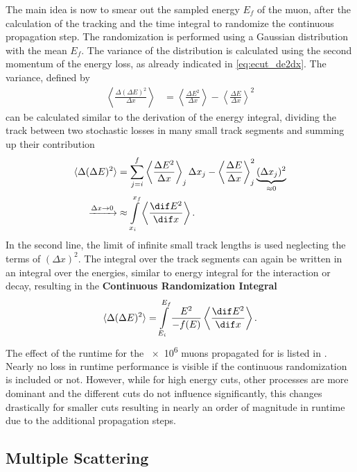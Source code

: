 The main idea is now to smear out the sampled energy $E_f$ of the muon, after the calculation of the tracking and the time integral to randomize the continuous propagation step.
The randomization is performed using a Gaussian distribution with the mean $E_f$.
The variance of the distribution is calculated using the second momentum of the energy loss, as already indicated in \eqref{eq:ecut_de2dx}.
The variance, defined by
\begin{align}
    \left\langle \frac{\Delta (\Delta E)^2}{\Delta x} \right\rangle &= \left\langle \frac{\Delta E^2}{\Delta x} \right\rangle - \left\langle \frac{\Delta E}{\Delta x} \right\rangle^2
\end{align}
can be calculated similar to the derivation of the energy integral, dividing the track between two stochastic losses in many small track segments and summing up their contribution
\begin{align}
    \langle \Delta (\Delta E)^2 \rangle
        &= \sum\limits_{j=i}^f \left\langle \frac{\Delta E^2}{\Delta x} \right\rangle_j \Delta x_j
            - \left\langle \frac{\Delta E}{\Delta x} \right\rangle_j^2 \underbrace{(\Delta x_j)^2}_{\approx 0}
        \\
    \xrightarrow{\Delta x \to 0} &\approx \int\limits_{x_i}^{x_f} \left\langle \frac{\dif E^2}{\dif x} \right\rangle .
\end{align}
In the second line, the limit of infinite small track lengths is used neglecting the terms of $(\Delta x)^2$.
The integral over the track segments can again be written in an integral over the energies, similar to energy integral for the interaction or decay, resulting in the \textbf{Continuous Randomization Integral}
\begin{align}
    \langle \Delta (\Delta E)^2 \rangle = \int\limits_{E_i}^{E_f} \frac{E^2}{-f(E)} \left\langle \frac{\dif E^2}{\dif x} \right\rangle .
\end{align}
The effect of the runtime for the \num{e6} muons propagated for  is listed in .
Nearly no loss in runtime performance is visible if the continuous randomization is included or not.
However, while for high energy cuts, other processes are more dominant and the different cuts do not influence significantly, this changes drastically for smaller cuts resulting in nearly an order of magnitude in runtime due to the additional propagation steps.

%

\subsection{Multiple Scattering}


